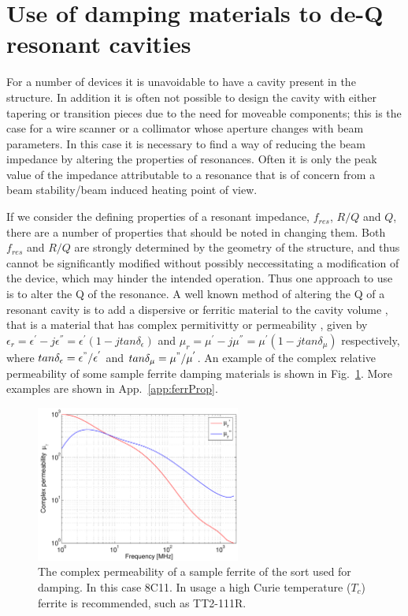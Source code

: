 \section{Use of damping materials to de-Q resonant cavities}
\label{sec:damping_materials}

For a number of devices it is unavoidable to have a cavity present in the structure. In addition it is often not possible to design the cavity with either tapering or transition pieces due to the need for moveable components; this is the case for a wire scanner or a collimator whose aperture changes with beam parameters. In this case it is necessary to find a way of reducing the beam impedance by altering the properties of resonances. Often it is only the peak value of the impedance attributable to a resonance that is of concern from a beam stability/beam induced heating point of view. 

If we consider the defining properties of a resonant impedance, $f_{res}$, $R/Q$ and $Q$, there are a number of properties that should be noted in changing them. Both $f_{res}$ and $R/Q$ are strongly determined by the geometry of the structure, and thus cannot be significantly modified without possibly neccessitating a modification of the device, which may hinder the intended operation. Thus one approach to use is to alter the Q of the resonance. A well known method of altering the Q of a resonant cavity is to add a dispersive or ferritic material to the cavity volume \cite{Klingbeil:ferrCav}, that is a material that has complex permitivitty or permeability , given by $\epsilon_{r} = \epsilon^{'} - j \epsilon^{''} = \epsilon^{'}(1-jtan\delta_{\epsilon})$ and $\mu_{r} = \mu^{'} - j \mu^{''} = \mu^{'}(1-jtan\delta_{\mu})$ respectively, where $tan\delta_{\epsilon} = \epsilon^{"}/\epsilon^{'}$ and $tan\delta_{\mu}=\mu^{"}/\mu^{'}$. An example of the complex relative permeability of some sample ferrite damping materials is shown in Fig.~\ref{fig:ferr_mu_damp}. More examples are shown in App.~\ref{app:ferrProp}.

\begin{figure}
\begin{center}
\includegraphics[width=0.6\textwidth]{Beam_Coupling_Impedance_Reduction_Techniques/figures/Ferrite8C11.pdf}
\end{center}
\caption{The complex permeability of a sample ferrite of the sort used for damping. In this case 8C11. In usage a high Curie temperature ($T_{c}$) ferrite is recommended, such as TT2-111R.}
\label{fig:ferr_mu_damp}
\end{figure}

